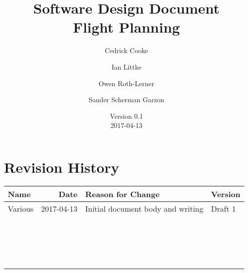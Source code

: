 \documentclass[12pt, letterpaper]{article}
\title{Software Design Document \\
Flight Planning
}
\author{ Cedrick Cooke
    \and Ian Littke
    \and Owen Roth-Lerner
    \and Sander Scherman Garzon
}
\date{Version 0.1 \\ 2017-04-13}
\begin{document}
\maketitle
\newpage
\section*{Revision History}
\begin{tabularx}{\textwidth}{|l|r|X|l|}
\hline
\textbf{Name} & \textbf{Date} & \textbf{Reason for Change} & \textbf{Version} \\ \hline
Various & 2017-04-13 & Initial document body and writing & Draft 1 \\ \hline
        &            &                                   &         \\ \hline
        &            &                                   &         \\ \hline
        &            &                                   &         \\ \hline
        &            &                                   &         \\ \hline
        &            &                                   &         \\ \hline
        &            &                                   &         \\ \hline
        &            &                                   &         \\ \hline
        &            &                                   &         \\ \hline
        &            &                                   &         \\ \hline
        &            &                                   &         \\ \hline
        &            &                                   &         \\ \hline
        &            &                                   &         \\ \hline
        &            &                                   &         \\ \hline
        &            &                                   &         \\ \hline
        &            &                                   &         \\ \hline
        &            &                                   &         \\ \hline
        &            &                                   &         \\ \hline
        &            &                                   &         \\ \hline
\end{tabularx}
\newpage
\tableofcontents
\newpage
\end{document}

